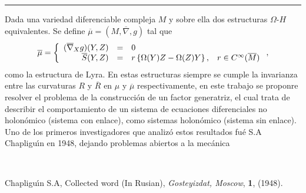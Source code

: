 \begin{titlepage}
\begin{minipage}{0.5\linewidth}
\begin{minipage}{0.45\linewidth}
    \begin{flushright}
        \printauthor
    \end{flushright}
\end{minipage} \hspace{0pt}
%
\begin{minipage}{0.02\linewidth}
      \color{ptctitle} \rule{1pt}{120pt}
\end{minipage} 
\end{minipage}
\hspace*{-4.5cm}
%
\begin{minipage}{0.85\linewidth}
\begin{minipage}{0.85\linewidth}
\footnotesize
\vspace{5pt}
    \begin{resumen} 
    Dada una variedad diferenciable compleja $M$ y sobre ella dos estructuras $\Omega$-$H$ equivalentes. Se define $\overline{\mu}=(M,\overline{\nabla},g)$ tal que
$$
\overline{\mu}=\left\{
   \begin{array}{rcl}
   (\overline{\nabla}_X g)(Y,Z) &=&0 \\
   \overline{S}(Y,Z)&=& r\left\{\Omega(Y)Z - \Omega(Z)Y\right\}, \hspace{0,3 cm} r\in C^\infty(\overline{M})
   \end{array}\right.,
$$
como la estructura de Lyra.
En estas estructuras siempre se cumple la invarianza entre las curvaturas $R$ y $\overline{R}$ en $\mu$ y $\overline{\mu}$ respectivamente, en este trabajo se proponre resolver el problema de la construcci\'on de un factor generatriz, el cual trata de describir el comportamiento de un sistema de ecuaciones diferenciales no holon\'omico (sistema con enlace), como sistemas holon\'omico (sistema sin enlace). Uno de los primeros investigadores que analiz\'o estos resultados fu\'e S.A Chapligu\'{\i}n en 1948, dejando problemas abiertos a la mec\'anica
    \end{resumen}
   \end{minipage}
   \vspace{10pt}
\end{minipage}
\vspace{10pt}\\[5pt]
  \vspace{10pt}
\begin{thebibliography}{99}
 Chapligu\'{\i}n S.A, Collected word (In Rusian), \textit{Gosteyizdat, Moscow},  \textbf{1}, (1948).


\end{thebibliography}
\end{titlepage}

